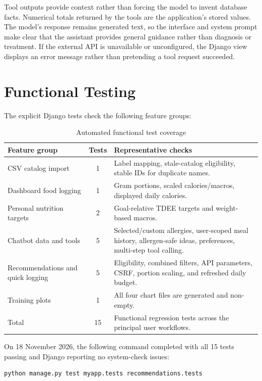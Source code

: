 \documentclass[12pt,a4paper]{report}
\begin{document}
Tool outputs provide context rather than forcing the model to invent database facts.
Numerical totals returned by the tools are the application's stored values. The model's
response remains generated text, so the interface and system prompt make clear that the
assistant provides general guidance rather than diagnosis or treatment. If the external
API is unavailable or unconfigured, the Django view displays an error message rather than
pretending a tool request succeeded.

\section{Functional Testing}
The explicit Django tests check the following feature groups:

\begin{table}[H]
\centering
\caption{Automated functional test coverage}
\begin{tabularx}{\textwidth}{p{}cX}
\toprule
Feature group & Tests & Representative checks\\
\midrule
CSV catalog import & 1 & Label mapping, stale-catalog eligibility, stable IDs for
duplicate names.\\
Dashboard food logging & 1 & Gram portions, scaled calories/macros, displayed daily
calories.\\
Personal nutrition targets & 2 & Goal-relative TDEE targets and weight-based macros.\\
Chatbot data and tools & 5 & Selected/custom allergies, user-scoped meal history,
allergen-safe ideas, preferences, multi-step tool calling.\\
Recommendations and quick logging & 5 & Eligibility, combined filters, API parameters,
CSRF, portion scaling, and refreshed daily budget.\\
Training plots & 1 & All four chart files are generated and non-empty.\\
\midrule
Total & 15 & Functional regression tests across the principal user workflows.\\
\bottomrule
\end{tabularx}
\end{table}

On 18 November 2026, the following command completed with all 15 tests passing and
Django reporting no system-check issues:
\begin{verbatim}
python manage.py test myapp.tests recommendations.tests
\end{verbatim}
\end{document}
